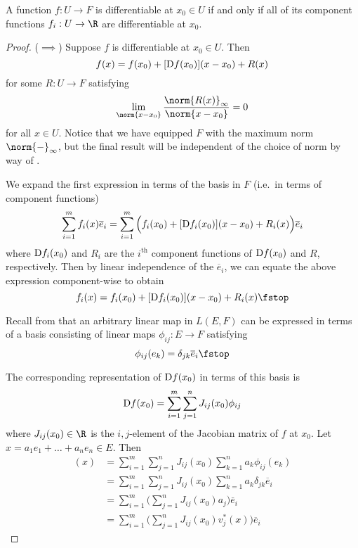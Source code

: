 \begin{proposition}
  \label{thm:comp-diff}
  A function \( f:U\to F \) is differentiable at \( x_0\in U \) if and only if all of its component functions \( f_i:U\to\R \) are differentiable at \( x_0 \).
\end{proposition}
\begin{proof}
  (\( \implies \)) Suppose \( f \) is differentiable at \( x_0\in U \). Then
  \[ f(x)=f(x_0)+[\text{D} f(x_0)](x-x_0)+R(x) \]
  for some \( R:U\to F \) satisfying
  \[ \lim_{\norm{x-x_0}}\frac{\norm{R(x)}_\infty}{\norm{x-x_0}}=0 \]
  for all \( x\in U \). Notice that we have equipped \( F \) with the maximum norm \( \norm{-}_\infty \), but the final result will be independent of the choice of norm by way of .

  \vspace{3mm}

  We expand the first expression in terms of the basis in \( F \) (i.e.\ in terms of component functions)
  \[ \sum_{i=1}^m f_i(x)\overline{e}_i= \sum_{i=1}^m\Big(f_i(x_0)+[\text{D} f_i(x_0)](x-x_0)+R_i(x)\Big)\overline{e}_i \]
  where \( \text{D} f_i(x_0) \) and \( R_i \) are the \( i^{\text{th}} \) component functions of \( \text{D} f(x_0) \) and \( R \), respectively. Then by linear independence of the \( \overline{e}_i \), we can equate the above expression component-wise to obtain
  \[ f_i(x)=f_i(x_0)+[\D f_i(x_0)](x-x_0)+R_i(x)\fstop \]

  Recall from  that an arbitrary linear map in \( L(E,F) \) can be expressed in terms of a basis consisting of linear maps \( \phi_{ij}:E\to F \) satisfying
  \[ \phi_{ij}(e_k)=\delta_{jk}\overline{e}_i\fstop \]

  The corresponding representation of \( \text{D} f(x_0) \) in terms of this basis is
  \[ \text{D} f(x_0)=\sum_{i=1}^m\sum_{j=1}^n J_{ij}(x_0)\phi_{ij} \]
  where \( J_{ij}(x_0)\in\R \) is the \( i,j \)-element of the Jacobian matrix of \( f \) at \( x_0 \). Let \( x=a_1e_1+\dots+a_ne_n\in E \). Then
  \begin{align*}
    [\D f(x_0)](x)&=\sum_{i=1}^m\sum_{j=1}^n J_{ij}(x_0)\sum_{k=1}^na_k\phi_{ij}(e_k)\\
    &= \sum_{i=1}^m\sum_{j=1}^n J_{ij}(x_0)\sum_{k=1}^na_k\delta_{jk}\overline{e}_i\\
    &= \sum_{i=1}^m\Big(\sum_{j=1}^nJ_{ij}(x_0)a_j\Big)\overline{e}_i\\
    &= \sum_{i=1}^m\Big(\sum_{j=1}^nJ_{ij}(x_0)v_j^*(x)\Big)\overline{e}_i
  \end{align*}


\end{proof}
